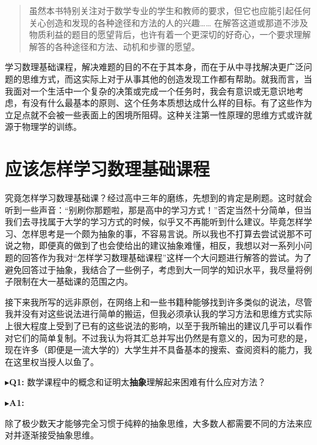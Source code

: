 \documentclass{ctexart}
\begin{document}
\begin{quotation}
  \kaishu
  虽然本书特别关注对于数学专业的学生和教师的要求，但它也应能引起任何关心创造和发现的各种途径和方法的人的兴趣…… 在解答这道或那道不涉及物质利益的题目的愿望背后，也许有着一个更深切的好奇心，一个要求理解解答的各种途径和方法、动机和步骤的愿望。
\end{quotation}

学习数理基础课程，解决难题的目的不在于其本身，而在于从中寻找解决更广泛问题的思维方式，而这实际上对于从事其他的创造发现工作都有帮助。就我而言，当我面对一个生活中一个复杂的决策或完成一个任务时，我会有意识或无意识地考虑，有没有什么最基本的原则、这个任务本质想达成什么样的目标。有了这些作为立足点就不会被一些表面上的困境所阻碍。这种关注第一性原理的思维方式或许就源于物理学的训练。

\section{应该怎样学习数理基础课程}

究竟怎样学习数理基础课？经过高中三年的磨练，先想到的肯定是刷题。这时就会听到一些声音：“别刷你那题啦，那是高中的学习方式！”否定当然十分简单，但当我们去寻找属于大学的学习方式的时候，似乎又不再能听到什么建议。毕竟怎样学习、怎样思考是一个颇为抽象的事，不容易言说。所以我也不打算去尝试说那不可说之物，即便真的做到了也会使给出的建议抽象难懂，相反，我想以对一系列小问题的回答作为我对“怎样学习数理基础课程”这样一个大问题进行解答的尝试。为了避免回答过于抽象，我结合了一些例子，考虑到大一同学的知识水平，我尽量将例子限制在大一基础课的范围之内。

接下来我所写的远非原创，在网络上和一些书籍种能够找到许多类似的说法，尽管我并没有对这些说法进行简单的搬运，但我必须承认我的学习方法和思维方式实际上很大程度上受到了已有的这些说法的影响，以至于我所输出的建议几乎可以看作对它们的简单复制。不过我认为将其汇总并写出仍然是有意义的，因为可悲的是，现在许多（即便是一流大学的）大学生并不具备基本的搜索、查阅资料的能力，我在这里权当授人以鱼了。


\noindent$\blacktriangleright$\;\textbf{Q1:} 数学课程中的概念和证明太\textbf{抽象}理解起来困难有什么应对方法？

\noindent$\blacktriangleright$\;\textbf{A1:} 

除了极少数天才能够完全习惯于纯粹的抽象思维，大多数人都需要不同的方法来应对并逐渐接受抽象思维。
\end{document}
